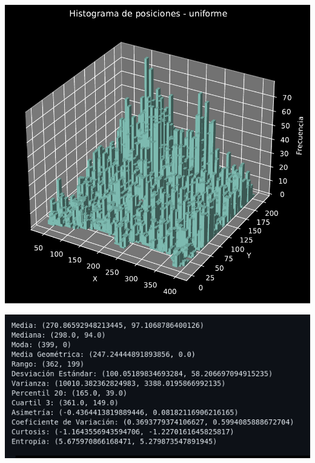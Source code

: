 \documentclass[11pt]{article} %
\begin{document}
	 \newpage
	 \begin{multicols}{2}
	 	\begin{minipage}{\linewidth}
	 		\centering
	 		\includegraphics[width=0.8\linewidth]{hist_posiciones_uniforme.pdf}
	 		\label{fig:posUnifHist}
	 	\end{minipage}
	 	\vfill\columnbreak
	 	\begin{minipage}{\linewidth}
	 		\centering
	 		\includegraphics[width=1\linewidth]{u3.png}%
	 		\label{posUnifMet}
	 	\end{minipage}
	 \end{multicols}
	 
\end{document}
